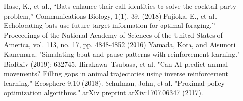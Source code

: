 \documentclass[main]{subfiles}
\begin{document}
\begin{thebibliography}{99}
    Hase, K., et al., “Bats enhance their call identities to solve the cocktail party problem,” Communications Biology, 1(1), 39. (2018)
    Fujioka, E., et al., Echolocating bats use future-target information for optimal foraging,” Proceedings of the National Academy of Sciences of the United States of America, vol. 113, no. 17, pp. 4848-4852 (2016)
    Yamada, Kota, and Atsunori Kanemura. "Simulating bout-and-pause patterns with reinforcement learning." BioRxiv (2019): 632745.
    Hirakawa, Tsubasa, et al. "Can AI predict animal movements? Filling gaps in animal trajectories using inverse reinforcement learning." Ecosphere 9.10 (2018).
    Schulman, John, et al. "Proximal policy optimization algorithms." arXiv preprint arXiv:1707.06347 (2017).
\end{thebibliography}
\end{document}
